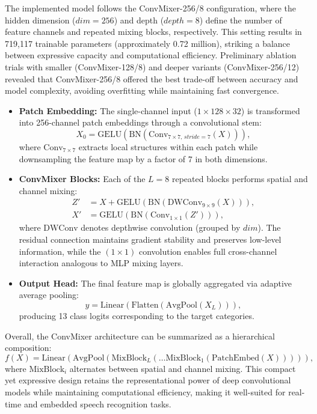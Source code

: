 The implemented model follows the ConvMixer-256/8 configuration, where the hidden dimension ($dim = 256$) and depth ($depth = 8$) define the number of feature channels and repeated mixing blocks, respectively. This setting results in 719,117 trainable parameters (approximately 0.72 million), striking a balance between expressive capacity and computational efficiency. Preliminary ablation trials with smaller (ConvMixer-128/8) and deeper variants (ConvMixer-256/12) revealed that ConvMixer-256/8 offered the best trade-off between accuracy and model complexity, avoiding overfitting while maintaining fast convergence.

\begin{itemize}
\item \textbf{Patch Embedding:} The single-channel input ($1 \times 128 \times 32$) is transformed into 256-channel patch embeddings through a convolutional stem:
\begin{equation*}
X_0 = \text{GELU}(\text{BN}(\text{Conv}_{7\times7,\,stride=7}(X))),
\end{equation*}
where $\text{Conv}_{7\times7}$ extracts local structures within each patch while downsampling the feature map by a factor of 7 in both dimensions.

\item \textbf{ConvMixer Blocks:} Each of the $L=8$ repeated blocks performs spatial and channel mixing:
\begin{align*}
Z' &= X + \text{GELU}(\text{BN}(\text{DWConv}_{9\times9}(X))), \\
X' &= \text{GELU}(\text{BN}(\text{Conv}_{1\times1}(Z'))),
\end{align*}
where $\text{DWConv}$ denotes depthwise convolution (grouped by $dim$). The residual connection maintains gradient stability and preserves low-level information, while the $(1\times1)$ convolution enables full cross-channel interaction analogous to MLP mixing layers.

\item \textbf{Output Head:} The final feature map is globally aggregated via adaptive average pooling:
\begin{equation*}
y = \text{Linear}(\text{Flatten}(\text{AvgPool}(X_L))),
\end{equation*}
producing 13 class logits corresponding to the target categories.
\end{itemize}

Overall, the ConvMixer architecture can be summarized as a hierarchical composition:
\begin{equation*}
f(X) = \text{Linear}(\text{AvgPool}(\text{MixBlock}_L(\dots \text{MixBlock}_1(\text{PatchEmbed}(X))))),
\end{equation*}
where $\text{MixBlock}_i$ alternates between spatial and channel mixing. This compact yet expressive design retains the representational power of deep convolutional models while maintaining computational efficiency, making it well-suited for real-time and embedded speech recognition tasks.


